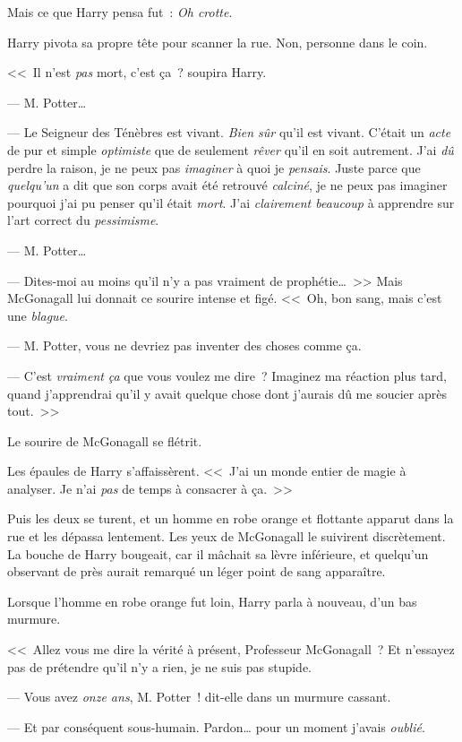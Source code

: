 Mais ce que Harry pensa fut~: \emph{Oh crotte}.

Harry pivota sa propre tête pour scanner la rue. Non, personne dans le coin.

<<~Il n'est \emph{pas} mort, c'est ça~? soupira Harry.

--- M. Potter…

--- Le Seigneur des Ténèbres est vivant. \emph{Bien sûr} qu'il est vivant. C'était un \emph{acte} de pur et simple \emph{optimiste} que de seulement \emph{rêver} qu'il en soit autrement. J'ai \emph{dû} perdre la raison, je ne peux pas \emph{imaginer} à quoi je \emph{pensais}. Juste parce que \emph{quelqu'un} a dit que son corps avait été retrouvé \emph{calciné}, je ne peux pas imaginer pourquoi j'ai pu penser qu'il était \emph{mort}. J'ai \emph{clairement beaucoup} à apprendre sur l'art correct du \emph{pessimisme}.

--- M. Potter…

--- Dites-moi au moins qu'il n'y a pas vraiment de prophétie…~>> Mais McGonagall lui donnait ce sourire intense et figé. <<~Oh, bon sang, mais c'est une \emph{blague}.

--- M. Potter, vous ne devriez pas inventer des choses comme ça.

--- C'est \emph{vraiment} \emph{ça} que vous voulez me dire~? Imaginez ma réaction plus tard, quand j'apprendrai qu'il y avait quelque chose dont j'aurais dû me soucier après tout.~>>

Le sourire de McGonagall se flétrit.

Les épaules de Harry s'affaissèrent. <<~J'ai un monde entier de magie à analyser. Je n'ai \emph{pas} de temps à consacrer à ça.~>>

Puis les deux se turent, et un homme en robe orange et flottante apparut dans la rue et les dépassa lentement. Les yeux de McGonagall le suivirent discrètement. La bouche de Harry bougeait, car il mâchait sa lèvre inférieure, et quelqu'un observant de près aurait remarqué un léger point de sang apparaître.

Lorsque l'homme en robe orange fut loin, Harry parla à nouveau, d'un bas murmure.

<<~Allez vous me dire la vérité à présent, Professeur McGonagall~? Et n'essayez pas de prétendre qu'il n'y a rien, je ne suis pas stupide.

--- Vous avez \emph{onze ans}, M. Potter~! dit-elle dans un murmure cassant.

--- Et par conséquent sous-humain. Pardon… pour un moment j'avais \emph{oublié}.

